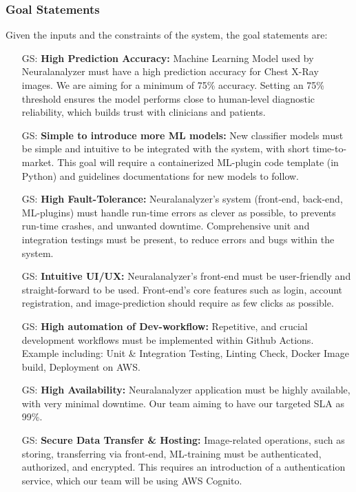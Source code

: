 \documentclass[12pt]{article}
\newcounter{goalnum} %
\begin{document}
\subsubsection{Goal Statements}
\noindent Given the inputs and the constraints of the system, the goal statements are:

\begin{itemize}

\item[GS\refstepcounter{goalnum}\thegoalnum \label{G_prediction_accuracy}:] \textbf{High Prediction Accuracy: }Machine Learning Model used by Neuralanalyzer must have a high prediction accuracy for Chest X-Ray images. We are aiming for a minimum of 75\% accuracy. Setting an 75\% threshold ensures the model performs close to human-level diagnostic reliability, which builds trust with clinicians and patients.
\item[GS\refstepcounter{goalnum}\thegoalnum \label{G_ease_of_ML_intro}:] \textbf{Simple to introduce more ML models: }New classifier models must be simple and intuitive to be integrated with the system, with short time-to-market. This goal will require a containerized ML-plugin code template (in Python) and guidelines documentations for new models to follow.
\item[GS\refstepcounter{goalnum}\thegoalnum \label{G_fault-tolerance}:] \textbf{High Fault-Tolerance: }Neuralanalyzer's system (front-end, back-end, ML-plugins) must handle run-time errors as clever as possible, to prevents run-time crashes, and unwanted downtime. Comprehensive unit and integration testings must be present, to reduce errors and bugs within the system.
\item[GS\refstepcounter{goalnum}\thegoalnum \label{G_good_UI}:] \textbf{Intuitive UI/UX: }Neuralanalyzer's front-end must be user-friendly and straight-forward to be used. Front-end's core features such as login, account registration, and image-prediction should require as few clicks as possible.
\item[GS\refstepcounter{goalnum}\thegoalnum \label{G_dev_work_automation}:] \textbf{High automation of Dev-workflow: }Repetitive, and crucial development workflows must be implemented within Github Actions. Example including: Unit \& Integration Testing, Linting Check, Docker Image build, Deployment on AWS.
\item[GS\refstepcounter{goalnum}\thegoalnum \label{G_avaialblity}:] \textbf{High Availability: }Neuralanalyzer application must be highly available, with very minimal downtime. Our team aiming to have our targeted SLA as 99\%.
\item[GS\refstepcounter{goalnum}\thegoalnum \label{G_data_security}:] \textbf{Secure Data Transfer \& Hosting: }Image-related operations, such as storing, transferring via front-end, ML-training must be authenticated, authorized, and encrypted. This requires an introduction of a authentication service, which our team will be using AWS Cognito.

\end{itemize}
\newpage
\end{document}
